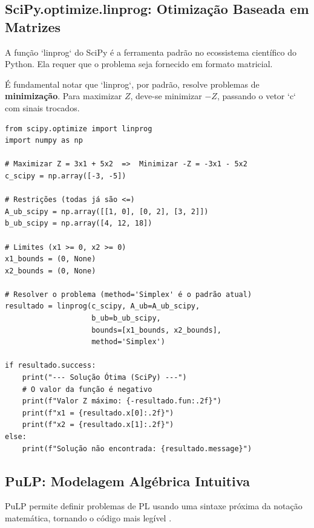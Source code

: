 \documentclass[conference]{IEEEtran}
\begin{document}
\subsection{SciPy.optimize.linprog: Otimização Baseada em Matrizes}
A função `linprog` do SciPy é a ferramenta padrão no ecossistema científico do Python. Ela requer que o problema seja fornecido em formato matricial.

É fundamental notar que `linprog`, por padrão, resolve problemas de \textbf{minimização}. Para maximizar $Z$, deve-se minimizar $-Z$, passando o vetor `c` com sinais trocados.

\begin{lstlisting}
from scipy.optimize import linprog
import numpy as np

# Maximizar Z = 3x1 + 5x2  =>  Minimizar -Z = -3x1 - 5x2
c_scipy = np.array([-3, -5])

# Restrições (todas já são <=)
A_ub_scipy = np.array([[1, 0], [0, 2], [3, 2]])
b_ub_scipy = np.array([4, 12, 18])

# Limites (x1 >= 0, x2 >= 0)
x1_bounds = (0, None)
x2_bounds = (0, None)

# Resolver o problema (method='Simplex' é o padrão atual)
resultado = linprog(c_scipy, A_ub=A_ub_scipy, 
                    b_ub=b_ub_scipy, 
                    bounds=[x1_bounds, x2_bounds], 
                    method='Simplex')

if resultado.success:
    print("--- Solução Ótima (SciPy) ---")
    # O valor da função é negativo
    print(f"Valor Z máximo: {-resultado.fun:.2f}") 
    print(f"x1 = {resultado.x[0]:.2f}")
    print(f"x2 = {resultado.x[1]:.2f}")
else:
    print(f"Solução não encontrada: {resultado.message}")
\end{lstlisting}

\subsection{PuLP: Modelagem Algébrica Intuitiva}
PuLP permite definir problemas de PL usando uma sintaxe próxima da notação matemática, tornando o código mais legível \cite{cordeiro}.
\end{document}
